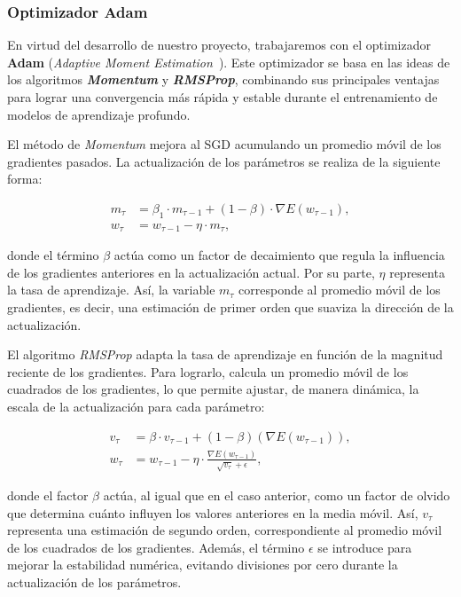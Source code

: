 \subsubsection{Optimizador Adam}\label{subsubsec:optimizador-adam}
En virtud del desarrollo de nuestro proyecto, trabajaremos con el optimizador \textbf{Adam} (\textit{Adaptive Moment Estimation}~\cite{Diederik2017}). Este optimizador se basa en las ideas de los algoritmos \textit{\textbf{Momentum}} y \textit{\textbf{RMSProp}}, combinando sus principales ventajas para lograr una convergencia más rápida y estable durante el entrenamiento de modelos de aprendizaje profundo.

El método de \textit{Momentum} mejora al SGD acumulando un promedio móvil de los gradientes pasados. La actualización de los parámetros se realiza de la siguiente forma:

\[
    \begin{aligned}
        m_{\tau} &= \beta_1 \cdot m_{\tau-1} + (1 - \beta) \cdot \nabla E(w_{\tau - 1}), \\
        w_{\tau} &= w_{\tau - 1} - \eta \cdot m_\tau,
    \end{aligned}
\]

donde el término $\beta$ actúa como un factor de decaimiento que regula la influencia de los gradientes anteriores en la actualización actual. Por su parte, $\eta$ representa la tasa de aprendizaje. Así, la variable $m_{\tau}$ corresponde al promedio móvil de los gradientes, es decir, una estimación de primer orden que suaviza la dirección de la actualización.

El algoritmo \textit{RMSProp} adapta la tasa de aprendizaje en función de la magnitud reciente de los gradientes. Para lograrlo, calcula un promedio móvil de los cuadrados de los gradientes, lo que permite ajustar, de manera dinámica, la escala de la actualización para cada parámetro:

\[
    \begin{aligned}
        v_{\tau} &= \beta \cdot v_{\tau-1} + (1- \beta)(\nabla E(w_{\tau-1})), \\
        w_{\tau} &= w_{\tau-1} - \eta \cdot \frac{\nabla E(w_{\tau-1})}{\sqrt{v_{\tau}}+\epsilon},
    \end{aligned}
\]

donde el factor $\beta$ actúa, al igual que en el caso anterior, como un factor de olvido que determina cuánto influyen los valores anteriores en la media móvil. Así, $v_{\tau}$ representa una estimación de segundo orden, correspondiente al promedio móvil de los cuadrados de los gradientes. Además, el término $\epsilon$ se introduce para mejorar la estabilidad numérica, evitando divisiones por cero durante la actualización de los parámetros.

